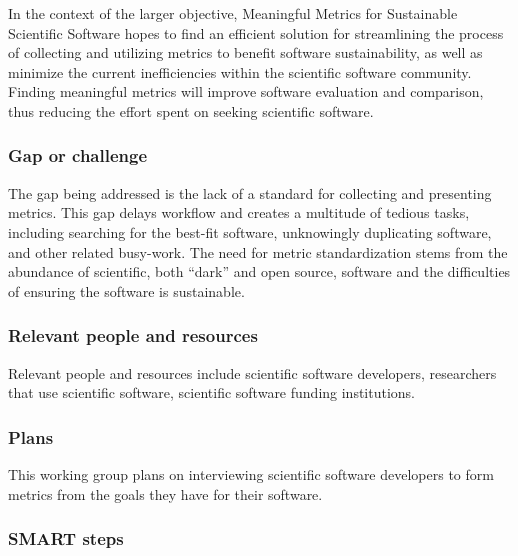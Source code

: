 In the context of the larger objective, Meaningful Metrics for Sustainable Scientific Software hopes to find an efficient solution for streamlining the process of collecting and utilizing metrics to benefit software sustainability, as well as minimize the current inefficiencies within the scientific software community. Finding meaningful metrics will improve software evaluation and comparison, thus reducing the effort spent on seeking scientific software.

\subsubsection{Gap or challenge}


The gap being addressed is the lack of a standard for collecting and presenting metrics. This gap delays workflow and creates a multitude of tedious tasks, including searching for the best-fit software, unknowingly duplicating software, and other related busy-work. The need for metric standardization stems from the abundance of scientific, both ``dark'' and open source, software and the difficulties of ensuring the software is sustainable. 

\subsubsection{Relevant people and resources}


Relevant people and resources include scientific software developers, researchers that use scientific software, scientific software funding institutions.

\subsubsection{Plans}


This working group plans on interviewing scientific software developers to form metrics from the goals they have for their software.

\subsubsection{SMART steps}


